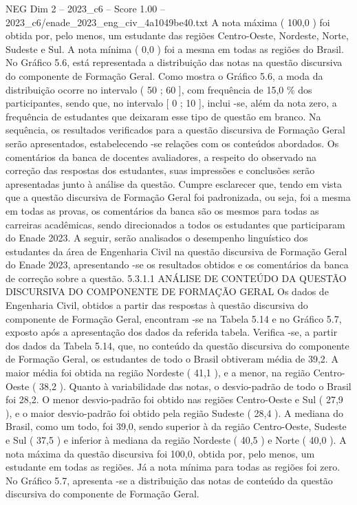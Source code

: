 \begin{textsample}{NEG Dim 2 – 2023\_c6 – Score 1.00 – 2023\_c6/enade\_2023\_eng\_civ\_4a1049be40.txt}
A nota máxima ( 100,0 ) foi obtida por, pelo menos, um estudante das regiões Centro-Oeste, Nordeste, Norte, Sudeste e Sul.
A nota mínima ( 0,0 ) foi a mesma em todas as regiões do Brasil.
No Gráfico 5.6, está representada a distribuição das notas na questão discursiva do componente de Formação Geral.
Como mostra o Gráfico 5.6, a moda da distribuição ocorre no intervalo ( 50 ; 60 ], com frequência de 15,0 \% dos participantes, sendo que, no intervalo [ 0 ; 10 ], inclui -se, além da nota zero, a frequência de estudantes que deixaram esse tipo de questão em branco.
Na sequência, os resultados verificados para a questão discursiva de Formação Geral serão apresentados, estabelecendo -se relações com os conteúdos abordados.
Os comentários da banca de docentes avaliadores, a respeito do observado na correção das respostas dos estudantes, suas impressões e conclusões serão apresentadas junto à análise da questão.
Cumpre esclarecer que, tendo em vista que a questão discursiva de Formação Geral foi padronizada, ou seja, foi a mesma em todas as provas, os comentários da banca são os mesmos para todas as carreiras acadêmicas, sendo direcionados a todos os estudantes que participaram do Enade 2023.
A seguir, serão analisados o desempenho linguístico dos estudantes da área de Engenharia Civil na questão discursiva de Formação Geral do Enade 2023, apresentando -se os resultados obtidos e os comentários da banca de correção sobre a questão. 5.3.1.1 ANÁLISE DE CONTEÚDO DA QUESTÃO DISCURSIVA DO COMPONENTE DE FORMAÇÃO GERAL Os dados de Engenharia Civil, obtidos a partir das respostas à questão discursiva do componente de Formação Geral, encontram -se na Tabela 5.14 e no Gráfico 5.7, exposto após a apresentação dos dados da referida tabela.
Verifica -se, a partir dos dados da Tabela 5.14, que, no conteúdo da questão discursiva do componente de Formação Geral, os estudantes de todo o Brasil obtiveram média de 39,2.
A maior média foi obtida na região Nordeste ( 41,1 ), e a menor, na região Centro-Oeste ( 38,2 ).
Quanto à variabilidade das notas, o desvio-padrão de todo o Brasil foi 28,2.
O menor desvio-padrão foi obtido nas regiões Centro-Oeste e Sul ( 27,9 ), e o maior desvio-padrão foi obtido pela região Sudeste ( 28,4 ).
A mediana do Brasil, como um todo, foi 39,0, sendo superior à da região Centro-Oeste, Sudeste e Sul ( 37,5 ) e inferior à mediana da região Nordeste ( 40,5 ) e Norte ( 40,0 ).
A nota máxima da questão discursiva foi 100,0, obtida por, pelo menos, um estudante em todas as regiões.
Já a nota mínima para todas as regiões foi zero.
No Gráfico 5.7, apresenta -se a distribuição das notas de conteúdo da questão discursiva do componente de Formação Geral.

\end{textsample}
